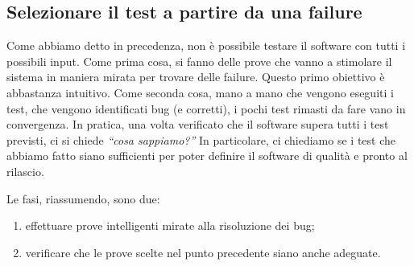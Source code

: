 \subsection{Selezionare il test a partire da una failure}

Come abbiamo detto in precedenza, non è possibile testare il software con tutti i possibili input. Come prima cosa, si fanno delle prove che vanno a stimolare il sistema in maniera mirata per trovare delle failure. Questo primo obiettivo è abbastanza intuitivo. Come seconda cosa, mano a mano che vengono eseguiti i test, che vengono identificati bug (e corretti), i pochi test rimasti da fare vano in convergenza. In pratica, una volta verificato che il software supera tutti i test previsti, ci si chiede \textit{``cosa sappiamo?''} In particolare, ci chiediamo se i test che abbiamo fatto siano sufficienti per poter definire il software di qualità e pronto al rilascio.

Le fasi, riassumendo, sono due: \begin{enumerate}
    \item effettuare prove intelligenti mirate alla risoluzione dei bug;
    \item verificare che le prove scelte nel punto precedente siano anche adeguate.
\end{enumerate}

